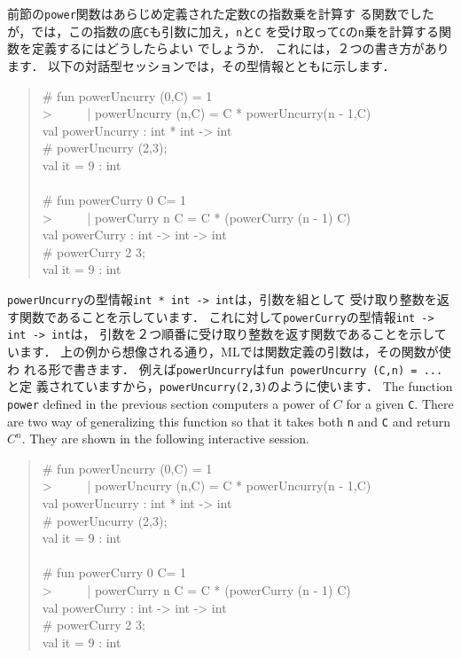 \documentclass{jbook}
\newenvironment{program}{\begin{tt}\begin{quote}}{\end{quote}\end{tt}}
\begin{document}
\ifx\jp%
	前節の{\tt power}関数はあらじめ定義された定数{\tt C}の指数乗を計算す
る関数でしたが，では，この指数の底{\tt C}も引数に加え，{\tt n}と{\tt C}
を受け取って{\tt C}の{\tt n}乗を計算する関数を定義するにはどうしたらよい
でしょうか．
	これには，２つの書き方があります．
	以下の対話型セッションでは，その型情報とともに示します．
\begin{tt}
\begin{quote}
\# fun powerUncurry (0,C) = 1\\
> \ \ \ \ \ | powerUncurry (n,C) = C * powerUncurry(n - 1,C)\\
val powerUncurry : int * int -> int\\
\# powerUncurry (2,3);\\
val it = 9 : int\\
\ \\
\# fun powerCurry 0 C= 1\\
> \ \ \ \ \ | powerCurry n C = C * (powerCurry (n - 1) C)\\
val powerCurry : int -> int -> int\\
\# powerCurry 2 3;\\
val it = 9 : int
\end{quote}
\end{tt}
	{\tt powerUncurry}の型情報{\tt int * int -> int}は，引数を組として
受け取り整数を返す関数であることを示しています．
	これに対して{\tt powerCurry}の型情報{\tt int -> int -> int}は，
引数を２つ順番に受け取り整数を返す関数であることを示しています．
	上の例から想像される通り，MLでは関数定義の引数は，その関数が使わ
れる形で書きます．
	例えば{\tt powerUncurry}は{\tt fun powerUncurry (C,n) = ...}と定
義されていますから，{\tt powerUncurry(2,3)}のように使います．
\else%
	The function {\tt power} defined in the previous section
computers a power of $C$ for a given {\tt C}.
	There are two way of generalizing this function so that it takes 
both {\tt n} and {\tt C} and return $C^n$.
	They are shown in the following interactive session.
\begin{program}
\# fun powerUncurry (0,C) = 1\\
> \ \ \ \ \ | powerUncurry (n,C) = C * powerUncurry(n - 1,C)\\
val powerUncurry : int * int -> int\\
\# powerUncurry (2,3);\\
val it = 9 : int\\
\ \\
\# fun powerCurry 0 C= 1\\
> \ \ \ \ \ | powerCurry n C = C * (powerCurry (n - 1) C)\\
val powerCurry : int -> int -> int\\
\# powerCurry 2 3;\\
val it = 9 : int
\end{program}
\end{document}
